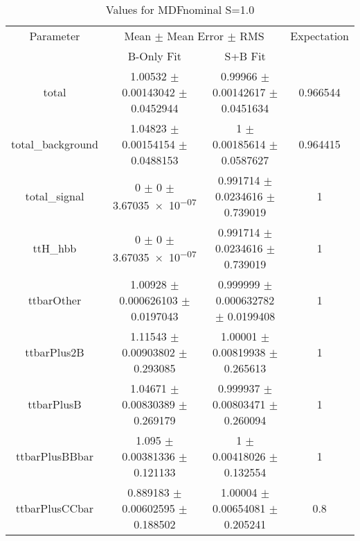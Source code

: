 \begin{table}
\centering
\caption{Values for MDFnominal S=1.0}
\begin{tabular}{cccc}
\toprule
Parameter & \multicolumn{2}{c}{Mean $\pm$ Mean Error $\pm$ RMS} & Expectation\\
 & B-Only Fit & S+B Fit & \\
\midrule
total & \num{1.00532} $\pm$ \num{0.00143042} $\pm$ \num{0.0452944} & \num{0.99966} $\pm$ \num{0.00142617} $\pm$ \num{0.0451634} & \num{0.966544}\\
total\_background & \num{1.04823} $\pm$ \num{0.00154154} $\pm$ \num{0.0488153} & \num{1} $\pm$ \num{0.00185614} $\pm$ \num{0.0587627} & \num{0.964415}\\
total\_signal & \num{0} $\pm$ \num{0} $\pm$ \num{3.67035e-07} & \num{0.991714} $\pm$ \num{0.0234616} $\pm$ \num{0.739019} & \num{1}\\
ttH\_hbb & \num{0} $\pm$ \num{0} $\pm$ \num{3.67035e-07} & \num{0.991714} $\pm$ \num{0.0234616} $\pm$ \num{0.739019} & \num{1}\\
ttbarOther & \num{1.00928} $\pm$ \num{0.000626103} $\pm$ \num{0.0197043} & \num{0.999999} $\pm$ \num{0.000632782} $\pm$ \num{0.0199408} & \num{1}\\
ttbarPlus2B & \num{1.11543} $\pm$ \num{0.00903802} $\pm$ \num{0.293085} & \num{1.00001} $\pm$ \num{0.00819938} $\pm$ \num{0.265613} & \num{1}\\
ttbarPlusB & \num{1.04671} $\pm$ \num{0.00830389} $\pm$ \num{0.269179} & \num{0.999937} $\pm$ \num{0.00803471} $\pm$ \num{0.260094} & \num{1}\\
ttbarPlusBBbar & \num{1.095} $\pm$ \num{0.00381336} $\pm$ \num{0.121133} & \num{1} $\pm$ \num{0.00418026} $\pm$ \num{0.132554} & \num{1}\\
ttbarPlusCCbar & \num{0.889183} $\pm$ \num{0.00602595} $\pm$ \num{0.188502} & \num{1.00004} $\pm$ \num{0.00654081} $\pm$ \num{0.205241} & \num{0.8}\\
\bottomrule
\end{tabular}
\end{table}